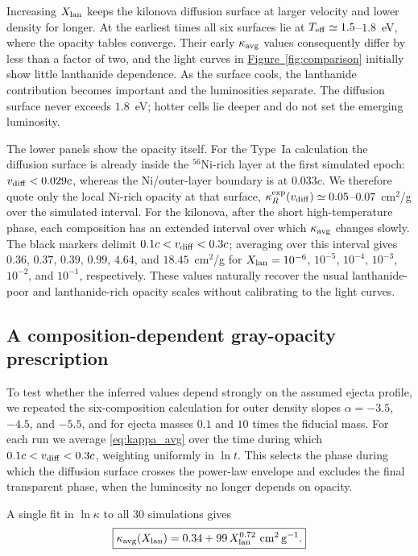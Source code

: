 \documentclass[final,5p,times,twocolumn]{elsarticle}
\DeclareRobustCommand{\figref}[1]{\hyperref[#1]{Figure~\ref*{#1}}}
\begin{document}
    Increasing $X_{\rm lan}$ keeps the kilonova diffusion surface at larger velocity and lower
    density for longer. At the earliest times all six surfaces lie at
    $T_{\rm eff}\simeq1.5$--$1.8$~eV, where the opacity tables converge. Their early
    $\kappa_{\rm avg}$ values consequently differ by less than a factor of two, and the light curves
    in \figref{fig:comparison} initially show little lanthanide dependence. As the surface cools,
    the lanthanide contribution becomes important and the luminosities separate. The diffusion
    surface never exceeds $1.8$~eV; hotter cells lie deeper and do not set the emerging luminosity.

    The lower panels show the opacity itself. For the Type~Ia calculation the diffusion surface is
    already inside the $^{56}$Ni-rich layer at the first simulated epoch:
    $v_{\rm diff}<0.029c$, whereas the Ni/outer-layer boundary is at $0.033c$. We therefore quote
    only the local Ni-rich opacity at that surface,
    $\kappa_R^{\rm exp}(v_{\rm diff})\simeq0.05$--$0.07$~cm$^2$/g over the simulated interval.
    For the kilonova, after the short high-temperature phase, each composition has an extended
    interval over which $\kappa_{\rm avg}$ changes slowly. The black markers delimit
    $0.1c<v_{\rm diff}<0.3c$; averaging over this interval gives $0.36$, $0.37$, $0.39$, $0.99$, $4.64$, and
    $18.45$~cm$^2$/g for $X_{\rm lan}=10^{-6}$, $10^{-5}$, $10^{-4}$, $10^{-3}$,
    $10^{-2}$, and $10^{-1}$, respectively. These values naturally recover the usual lanthanide-poor and
    lanthanide-rich opacity scales without calibrating to the light curves.

    \subsection{A composition-dependent gray-opacity prescription}

    To test whether the inferred values depend strongly on the assumed ejecta profile, we repeated
    the six-composition calculation for outer density slopes $\alpha=-3.5$, $-4.5$, and $-5.5$,
    and for ejecta masses $0.1$ and $10$ times the fiducial mass. For each run we average
    \eqref{eq:kappa_avg} over the time during which
    $0.1c<v_{\rm diff}<0.3c$, weighting uniformly in $\ln t$. This selects the phase during which
    the diffusion surface crosses the power-law envelope and excludes the final transparent phase,
    when the luminosity no longer depends on opacity.

    A single fit in $\ln\kappa$ to all 30 simulations gives
    \begin{equation}
        \boxed{\displaystyle
        \kappa_{\rm avg}(X_{\rm lan}) =
        0.34 + 99\,X_{\rm lan}^{0.72}\ {\rm cm^2\,g^{-1}} .}
        \label{eq:kappa_xlan}
    \end{equation}
\end{document}
